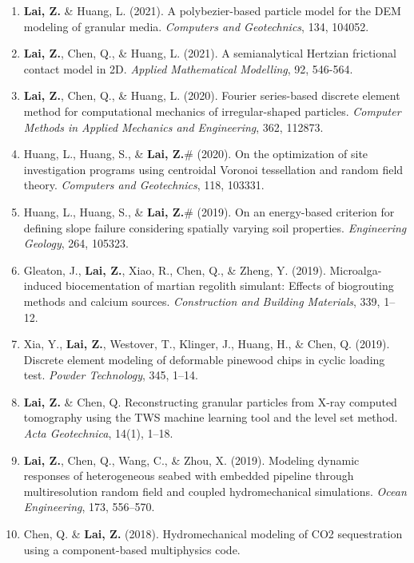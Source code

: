 \documentclass[11pt,]{elsarticle}
\providecommand{\tightlist}{%
  \setlength{\itemsep}{0pt}\setlength{\parskip}{0pt}}
\begin{document}
\begin{enumerate}
\def\labelenumi{\arabic{enumi}.}
\tightlist
\item
  \textbf{Lai, Z.} \& Huang, L. (2021). A polybezier-based particle
  model for the DEM modeling of granular media. \emph{Computers and
  Geotechnics}, 134, 104052.
\item
  \textbf{Lai, Z.}, Chen, Q., \& Huang, L. (2021). A semianalytical
  Hertzian frictional contact model in 2D. \emph{Applied Mathematical
  Modelling}, 92, 546-564.
\item
  \textbf{Lai, Z.}, Chen, Q., \& Huang, L. (2020). Fourier series-based
  discrete element method for computational mechanics of
  irregular-shaped particles. \emph{Computer Methods in Applied
  Mechanics and Engineering}, 362, 112873.
\item
  Huang, L., Huang, S., \& \textbf{Lai, Z.}\# (2020). On the
  optimization of site investigation programs using centroidal Voronoi
  tessellation and random field theory. \emph{Computers and
  Geotechnics}, 118, 103331.
\item
  Huang, L., Huang, S., \& \textbf{Lai, Z.}\# (2019). On an energy-based
  criterion for defining slope failure considering spatially varying
  soil properties. \emph{Engineering Geology}, 264, 105323.
\item
  Gleaton, J., \textbf{Lai, Z.}, Xiao, R., Chen, Q., \& Zheng, Y.
  (2019). Microalga-induced biocementation of martian regolith simulant:
  Effects of biogrouting methods and calcium sources. \emph{Construction
  and Building Materials}, 339, 1--12.
\item
  Xia, Y., \textbf{Lai, Z.}, Westover, T., Klinger, J., Huang, H., \&
  Chen, Q. (2019). Discrete element modeling of deformable pinewood
  chips in cyclic loading test. \emph{Powder Technology}, 345, 1--14.
\item
  \textbf{Lai, Z.} \& Chen, Q. Reconstructing granular particles from
  X-ray computed tomography using the TWS machine learning tool and the
  level set method. \emph{Acta Geotechnica}, 14(1), 1--18.
\item
  \textbf{Lai, Z.}, Chen, Q., Wang, C., \& Zhou, X. (2019). Modeling
  dynamic responses of heterogeneous seabed with embedded pipeline
  through multiresolution random field and coupled hydromechanical
  simulations. \emph{Ocean Engineering}, 173, 556--570.
\item
  Chen, Q. \& \textbf{Lai, Z.} (2018). Hydromechanical modeling of CO2
  sequestration using a component-based multiphysics code.

\end{enumerate}
\end{document}
